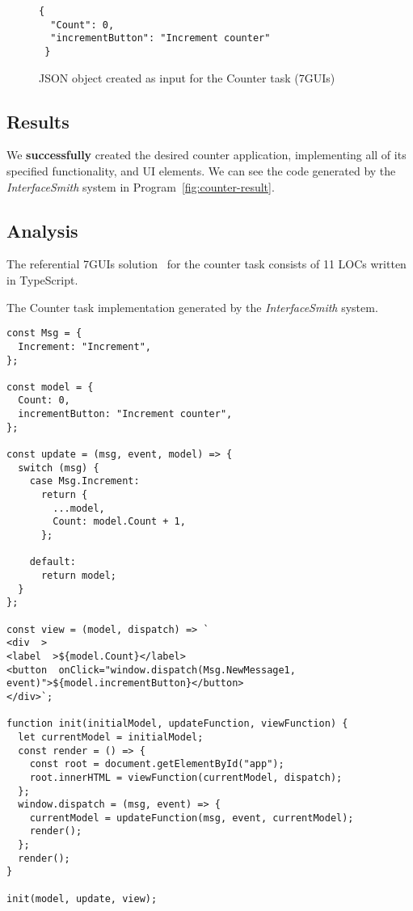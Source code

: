 \begin{figure}[htbp]
	\caption{JSON object created as input for the Counter task (7GUIs)}
	\label{fig:counter-json}
	\begin{lstlisting}
{
  "Count": 0,
  "incrementButton": "Increment counter"
 }
    \end{lstlisting}
\end{figure}
\medskip
\subsection{Results}
We \textbf{successfully} created the desired counter application, implementing all of its specified functionality, and UI elements.
We can see the code generated by the \emph{InterfaceSmith} system in Program~\ref{fig:counter-result}.
\medskip
\subsection{Analysis}
The referential 7GUIs solution~\cite{7guis-React-TypeScript-MobX/src/app/guis/counter.tsx} for the counter task consists of 11 LOCs written in TypeScript.


\begin{listing}[p]
	\caption {The Counter task implementation generated by the \emph{InterfaceSmith} system.}
	\label{fig:counter-result}
	\begin{lstlisting}
const Msg = {
  Increment: "Increment",
};

const model = {
  Count: 0,
  incrementButton: "Increment counter",
};

const update = (msg, event, model) => {
  switch (msg) {
    case Msg.Increment:
      return {
        ...model,
        Count: model.Count + 1,
      };

    default:
      return model;
  }
};

const view = (model, dispatch) => `
<div  >
<label  >${model.Count}</label>
<button  onClick="window.dispatch(Msg.NewMessage1, event)">${model.incrementButton}</button>
</div>`;

function init(initialModel, updateFunction, viewFunction) {
  let currentModel = initialModel;
  const render = () => {
    const root = document.getElementById("app");
    root.innerHTML = viewFunction(currentModel, dispatch);
  };
  window.dispatch = (msg, event) => {
    currentModel = updateFunction(msg, event, currentModel);
    render();
  };
  render();
}

init(model, update, view);
\end{lstlisting}
\end{listing}


